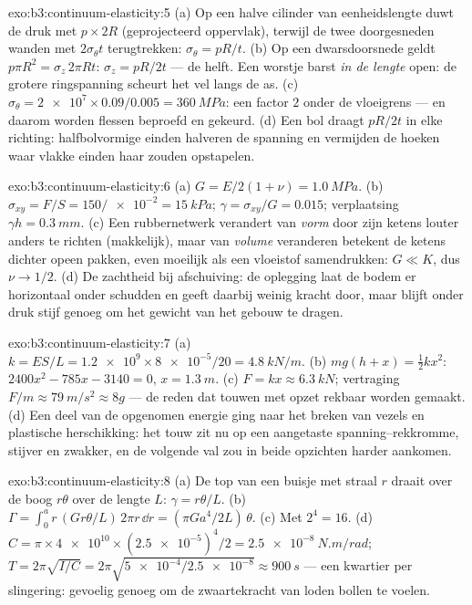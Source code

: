 \begin{solution}{exo:b3:continuum-elasticity:5}
(a) Op een halve cilinder van eenheidslengte duwt de druk met $p
\times 2R$ (geprojecteerd oppervlak), terwijl de twee doorgesneden wanden
met $2\sigma_\theta t$ terugtrekken: $\sigma_\theta = pR/t$. (b) Op een
dwarsdoorsnede geldt $p\pi R^2 = \sigma_z\,2\pi Rt$: $\sigma_z = pR/2t$
--- de helft. Een worstje barst \emph{in de lengte} open: de grotere
ringspanning scheurt het vel langs de as. (c) $\sigma_\theta = \num{2e7} \times
0.09/0.005 = \qty{360}{MPa}$: een factor $2$ onder de vloeigrens
--- en daarom worden flessen beproefd en gekeurd. (d) Een bol draagt
$pR/2t$ in elke richting: halfbolvormige einden halveren de spanning en
vermijden de hoeken waar vlakke einden haar zouden opstapelen.
\end{solution}

\begin{solution}{exo:b3:continuum-elasticity:6}
(a) $G = E/2(1 + \nu) = \qty{1.0}{MPa}$. (b) $\sigma_{xy} = F/S =
150/\num{e-2} = \qty{15}{kPa}$; $\gamma = \sigma_{xy}/G = 0.015$;
verplaatsing $\gamma h = \qty{0.3}{mm}$. (c) Een rubbernetwerk verandert
van \emph{vorm} door zijn ketens louter anders te richten (makkelijk),
maar van \emph{volume} veranderen betekent de ketens dichter opeen
pakken, even moeilijk als een vloeistof samendrukken: $G \ll K$, dus $\nu \to 1/2$. (d) De zachtheid bij afschuiving: de oplegging laat de bodem
er horizontaal onder schudden en geeft daarbij weinig kracht door, maar
blijft onder druk stijf genoeg om het gewicht van het gebouw te dragen.
\end{solution}

\begin{solution}{exo:b3:continuum-elasticity:7}
(a) $k = ES/L = \num{1.2e9} \times \num{8e-5}/20 = \qty{4.8}{kN/m}$.
(b) $mg(h + x) = \tfrac12 kx^2$: $2400x^2 - 785x - 3140 = 0$, $x =
\qty{1.3}{m}$. (c) $F = kx \approx \qty{6.3}{kN}$; vertraging $F/m
\approx \qty{79}{m/s^2} \approx 8g$ --- de reden dat touwen met opzet
rekbaar worden gemaakt. (d) Een deel van de opgenomen energie ging naar
het breken van vezels en plastische herschikking: het touw zit nu op een
aangetaste spanning--rekkromme, stijver en zwakker, en de volgende val
zou in beide opzichten harder aankomen.
\end{solution}

\begin{solution}{exo:b3:continuum-elasticity:8}
(a) De top van een buisje met straal $r$ draait over de boog $r\theta$
over de lengte $L$: $\gamma = r\theta/L$. (b) $\Gamma = \int_0^a r\,(G r\theta/L)\,
2\pi r\,\dd r = (\pi Ga^4/2L)\,\theta$. (c) Met $2^4 = 16$. (d) $C =
\pi \times \num{4e10} \times (\num{2.5e-5})^4/2 =
\qty{2.5e-8}{N.m/rad}$; $T = 2\pi\sqrt{I/C} = 2\pi\sqrt{\num{5e-4}/
\num{2.5e-8}} \approx \qty{900}{s}$ --- een kwartier per slingering:
gevoelig genoeg om de zwaartekracht van loden bollen te voelen.
\end{solution}

